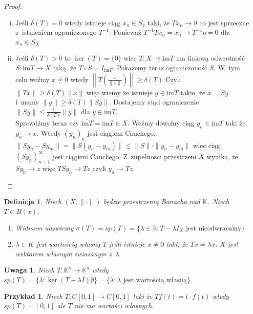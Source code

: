 \documentclass[11pt]{mwrep}
\renewcommand{\[}{\begin{equation}}
\renewcommand{\]}{\end{equation}}
\newcommand{\K}{\ensuremath{\mathbb{K}}}
\newcommand{\norm}{\|\cdot\|}
\newcommand{\spac}[1][X]{$(#1,\norm)$ }
\newcommand{\im}{\mathrm{im}}
\newtheorem{uwaga}[subsection]{Uwaga}
\newtheorem{de}[subsection]{Definicja}
\newtheorem{ex}[subsection]{Przykład}
\newcounter{numer}
\begin{document}
\begin{proof}
	\begin{enumerate}[(i)]
		\item Jeśli $ \delta(T) =0$ wtedy istnieje ciąg $x_n \in S_x$ taki, że $T{x_{n}}\to 0$ co jest sprzeczne 
			z~istnieniem ograniczonego $T^{-1}$.  Ponieważ $ T^{-1 }T x_n = x_n \to T^{-1}o = 0$ dla $x_n \in S_X$ 
		\item Jeśli $\delta(T)>0$ to $\ker(T) = \{0\}$ wiec $ T\colon X \to \im T$ ma liniową odwrotność
			$S\colon \im T \to X$ taką, że $T\circ S = I_{\im T}$.
			Pokażemy teraz ograniczoność $S$. W~tym celu weźmy $x\not = 0$ wtedy $\left\|T\left( \frac{x}{\|x\|} \right)\right\|\ge \delta(T)$
			Czyli $\|Tx\| \ge \delta(T) \|x\|$ więc wiemy że istnieje $y\in \im T$ takie, że $x=Sy$ i~mamy 
			$\|y\|\ge \delta(T) \|Sy\|$.
			Dostajemy stąd ograniczenie $\|Sy\| \le \frac{1}{\delta(T)}\|y\|$ dla $y\in \im T$.\\
			Sprawdźmy teraz czy $\overline{\im T} = \im T \in X$.
			Weźmy dowolny ciąg $y_n \in \im T$ taki że $y_n \to x$.  Wtedy $(y_n)_n$ jest ciągiem Cauchego. 
			$\|S{y_n} - S{y_m}\|=\|S(y_n - y_m)\|\le \|S\| \cdot \|y_n -y_m\|$ wiec ciąg $(S y_n)_{n=1}^\infty$ jest ciągiem Cauchego.
			Z~zupełności przestrzeni $X$ wynika, że $S y_n \to z$ więc $T S y_n \to T z$ czyli $y_n \to Tz$ 
	\end{enumerate}
\end{proof}
\begin{de}
	Niech \spac będzie przestrzenią Banacha nad \K.~Niech $T \in B(x)$.
	\begin{enumerate}
		\item Widmem nazwiemy $\sigma(T) = sp(T) = \{ \lambda \in \K : T -\lambda I_X \textrm{ jest nieodwracalny}\}$ 
		\item $\lambda\in K$ jest wartością własną $T$ jeśli istnieje $x\not  =0$ taki, że $Tx = \lambda x$. 
			$X$ jest wektorem  własnym zwiazanym z~$\lambda$
	\end{enumerate}
\end{de}
\begin{uwaga}
	Niech $T\colon \K^n \to \K^n$ wtedy $sp(T) = \{\lambda: \ker(T-\lambda I) \not 0\} = \{\lambda :\lambda \textrm{ jest wartością własną} \}$
\end{uwaga}
\begin{ex}
	Niech $T\colon C[0,1] \to C[0,1]$ taki że $Tf(t) = t\cdot f(t)$ wtedy $sp(T) = [0,1]$ ale $T$ nie ma wartości własnych.
\end{ex}
\end{document}
